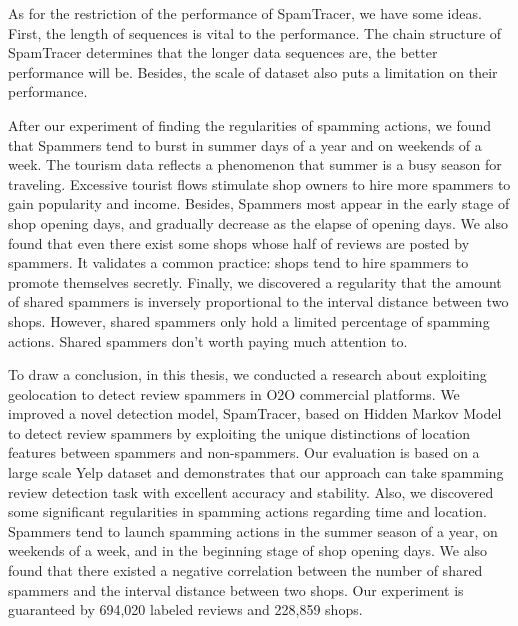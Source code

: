 \begin{bigabstract}
As for the restriction of the performance of SpamTracer, we have some ideas. First, the length of sequences is vital to the performance. The chain structure of SpamTracer determines that the longer data sequences are, the better performance will be. Besides, the scale of dataset also puts a limitation on their performance. 

After our experiment of finding the regularities of spamming actions, we found that Spammers tend to burst in summer days of a year and on weekends of a week. The tourism data reflects a phenomenon that summer is a busy season for traveling. Excessive tourist flows stimulate shop owners to hire more spammers to gain popularity and income. Besides, Spammers most appear in the early stage of shop opening days, and gradually decrease as the elapse of opening days. We also found that even there exist some shops whose half of reviews are posted by spammers. It validates a common practice: shops tend to hire spammers to promote themselves secretly. Finally, we discovered a regularity that the amount of shared spammers is inversely proportional to the interval distance between two shops. However, shared spammers only hold a limited percentage of spamming actions. Shared spammers don't worth paying much attention to.

To draw a conclusion, in this thesis, we conducted a research about exploiting geolocation to detect review spammers in O2O commercial platforms. We improved a novel detection model, SpamTracer, based on Hidden Markov Model to detect review spammers by exploiting the unique distinctions of location features between spammers and non-spammers. Our evaluation is based on a large scale Yelp dataset and demonstrates that our approach can take spamming review detection task with excellent accuracy and stability. Also, we discovered some significant regularities in spamming actions regarding time and location. Spammers tend to launch spamming actions in the summer season of a year, on weekends of a week, and in the beginning stage of shop opening days. We also found that there existed a negative correlation between the number of shared spammers and the interval distance between two shops. Our experiment is guaranteed by 694,020 labeled reviews and 228,859 shops.


\end{bigabstract}